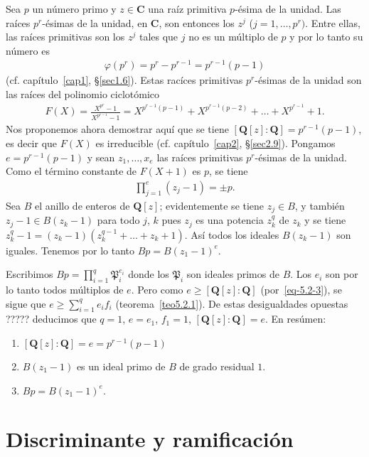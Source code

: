 \documentclass[bibtotoc,leqno,spanish]{amsbook}
\newcommand{\QQ}{\mathbf{Q}}
\newcommand{\CC}{\mathbf{C}}
\newcommand{\idl}[1]{\mathfrak{#1}}
\numberwithin{equation}{section}
\theoremstyle{note}
\theoremstyle{note}
\theoremstyle{rem}
\numberwithin{theorem}{section}
\numberwithin{proposition}{section}
\numberwithin{definition}{section}
\numberwithin{lemma}{section}
\numberwithin{corollary}{section}
\numberwithin{example}{section}
\numberwithin{footnote}{section}%
\begin{document}
Sea $p$ un n\'umero primo y $z\in\CC$ una ra\'iz primitiva $p$-\'esima de la unidad. Las ra\'ices $p^{r}$-\'esimas
de la unidad, en $\CC$, son entonces los $z^{j}$ ($j=1,\dots,p^{r})$. Entre ellas, las ra\'ices primitivas son los
$z^{j}$ tales que $j$ no es un m\'ultiplo de $p$ y por lo tanto su n\'umero es
\begin{gather*}
\varphi(p^{r}) = p^{r}-p^{r-1}=p^{r-1}(p-1)
\end{gather*}
(cf. cap\'itulo~\ref{cap1}, \S\ref{sec1.6}). Estas rac\'ices primitivas $p^{r}$-\'esimas de la unidad son las ra\'ices del
polinomio ciclot\'omico
\begin{gather}\label{eq-5.2-3}
F(X) = \frac{X^{p^{r}}-1}{X^{p^{r-1}}-1} = X^{p^{r-1}(p-1)}+X^{p^{r-1}(p-2)}+\dots+X^{p^{r-1}}+1.
\end{gather}
Nos proponemos ahora demostrar aqu\'i que se tiene $[\QQ[z]:\QQ] = p^{r-1}(p-1)$, es decir que $F(X)$ es irreducible
(cf. cap\'itulo~\ref{cap2}, \S\ref{sec2.9}). Pongamos $e=p^{r-1}(p-1)$ y sean $z_{1},\dots,x_{e}$ las ra\'ices primitivas
$p^{r}$-\'esimas de la unidad. Como el t\'ermino constante de $F(X+1)$ es $p$, se tiene
\begin{gather*}
\prod_{j=1}^{e}(z_{j}-1) = \pm p.
\end{gather*}
Sea $B$ el anillo de enteros de $\QQ[z]$; evidentemente se tiene $z_{j}\in B$, y tambi\'en $z_{j}-1\in B(z_{k}-1)$
para todo $j$, $k$ pues $z_{j}$ es una potencia $z_{k}^{q}$ de $z_{k}$ y se tiene $z_{k}^{q}-1=(z_{k}-1)(z_{k}^{q-1}+
\dots+z_{k}+1)$. As\'i todos los ideales $B(z_{k}-1)$ son iguales. Tenemos por lo tanto $Bp = B(z_{1}-1)^{e}$.

Escribimos $Bp = \prod_{i=1}^{q}\idl{P}_{i}^{e_{i}}$ donde los $\idl{P}_{i}$ son ideales primos de $B$. Los
$e_{i}$ son por lo tanto todos m\'ultiplos de $e$. Pero como $e\geq[\QQ[z]:\QQ]$ (por~\eqref{eq-5.2-3}), se sigue
que $e\geq \sum_{i=1}^{q}e_{i}f_{i}$ (teorema~\ref{teo5.2.1}). De estas desigualdades opuestas ????? deducimos que
$q=1$, $e=e_{1}$, $f_{1}=1$, $[\QQ[z]:\QQ]=e$. En res\'umen:
\begin{enumerate}
\item $[\QQ[z]:\QQ]=e=p^{r-1}(p-1)$
\item $B(z_{1}-1)$ es un ideal primo de $B$ de grado residual $1$.
\item $Bp = B(z_{1}-1)^{e}$.
\end{enumerate}

\section{Discriminante y ramificaci\'on}\label{sec5.3}
\end{document}
